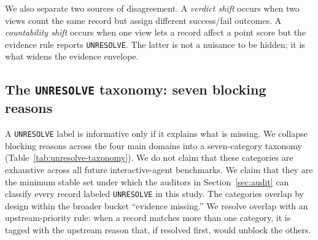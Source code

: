 \documentclass{article}
\begin{document}
We also separate two sources of disagreement. A \emph{verdict shift} occurs
when two views count the same record but assign different success/fail outcomes.
A \emph{countability shift} occurs when one view lets a record affect a point
score but the evidence rule reports \texttt{UNRESOLVE}. The latter is not a
nuisance to be hidden; it is what widens the evidence envelope.

\subsection{The \texttt{UNRESOLVE} taxonomy: seven blocking reasons}
\label{sec:taxonomy}

A \texttt{UNRESOLVE} label is informative only if it explains what is missing.
We collapse blocking reasons across the four main domains into a seven-category
taxonomy (Table~\ref{tab:unresolve-taxonomy}). We do not claim that these
categories are exhaustive across all future interactive-agent benchmarks. We
claim that they are the minimum stable set under which the auditors in
Section~\ref{sec:audit} can classify every record labeled \texttt{UNRESOLVE}
in this study. The categories overlap by design within the broader bucket
``evidence missing.'' We resolve overlap with an upstream-priority rule: when a
record matches more than one category, it is tagged with the upstream reason
that, if resolved first, would unblock the others.
\end{document}
